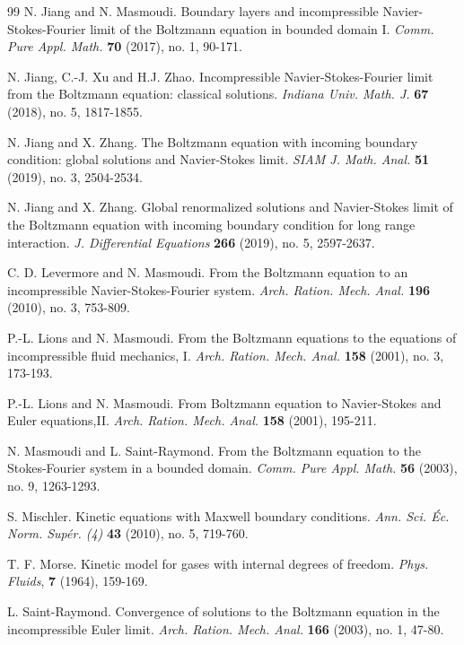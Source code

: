 \documentclass[reqno,11pt]{amsart}
\numberwithin{equation}{section}
\begin{document}
\begin{thebibliography}{99}
 N. Jiang and N. Masmoudi. Boundary layers and incompressible Navier-Stokes-Fourier limit of the Boltzmann equation in bounded domain I. {\em Comm. Pure Appl. Math.} {\bf 70} (2017), no. 1, 90-171.
    
 N. Jiang, C.-J. Xu and H.J. Zhao. Incompressible Navier-Stokes-Fourier limit from the Boltzmann equation: classical solutions. {\em Indiana Univ. Math. J.} {\bf 67} (2018), no. 5, 1817-1855.
    
 N. Jiang and X. Zhang. The Boltzmann equation with incoming boundary condition: global solutions and Navier-Stokes limit. {\em SIAM J. Math. Anal.} {\bf 51} (2019), no. 3, 2504-2534. 
    
 N. Jiang and X. Zhang. Global renormalized solutions and Navier-Stokes limit of the Boltzmann equation with incoming boundary condition for long range interaction. {\em J. Differential Equations} {\bf 266} (2019), no. 5, 2597-2637. 
    
 C. D. Levermore and N. Masmoudi. From the Boltzmann equation to an incompressible Navier-Stokes-Fourier system. {\em Arch. Ration. Mech. Anal.} {\bf 196} (2010), no. 3, 753-809.
    
 P.-L. Lions and N. Masmoudi. From the Boltzmann equations to the equations of incompressible ﬂuid mechanics, I. {\em Arch. Ration. Mech. Anal.} {\bf 158} (2001), no. 3, 173-193.
     
 P.-L. Lions and N. Masmoudi. From Boltzmann equation to Navier-Stokes and Euler equations,II. {\em Arch. Ration. Mech. Anal.} {\bf 158} (2001), 195-211.
    
 N. Masmoudi and L. Saint-Raymond. From the Boltzmann equation to the Stokes-Fourier system in a bounded domain. {\em Comm. Pure Appl. Math.} {\bf 56} (2003), no. 9, 1263-1293.
    
 S. Mischler. Kinetic equations with Maxwell boundary conditions. {\em Ann. Sci. \'Ec. Norm. Sup\'er. (4)} {\bf 43} (2010), no. 5, 719-760.

 T. F. Morse. Kinetic model for gases with internal degrees of freedom. {\em Phys. Fluids}, {\bf 7} (1964), 159-169.
    
 L. Saint-Raymond. Convergence of solutions to the Boltzmann equation in the incompressible Euler limit. {\em Arch. Ration. Mech. Anal.} {\bf 166} (2003), no. 1, 47-80.
    

\end{thebibliography}
\end{document}
